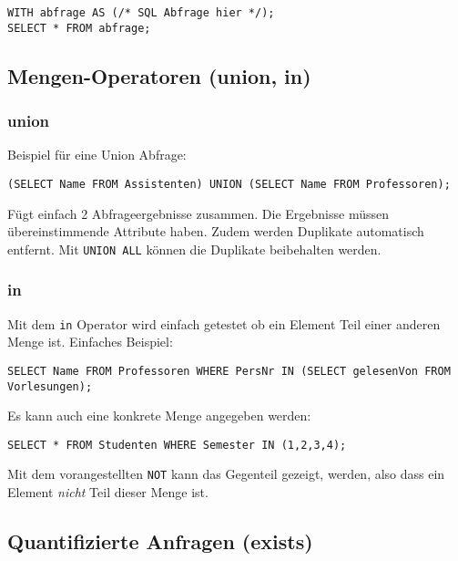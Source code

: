 \begin{lstlisting}[caption={with Operator},label=lst:with]
WITH abfrage AS (/* SQL Abfrage hier */);
SELECT * FROM abfrage;
\end{lstlisting}

\subsection{Mengen-Operatoren (union, in)}
\label{sec:mengen_operatoren}

\subsubsection{union}
Beispiel für eine Union Abfrage:

\begin{lstlisting}[caption={Union Abfrage Beispiel},label=lst:union_bsp]
(SELECT Name FROM Assistenten) UNION (SELECT Name FROM Professoren);
\end{lstlisting}

Fügt einfach 2 Abfrageergebnisse zusammen. Die Ergebnisse müssen übereinstimmende Attribute haben. Zudem werden Duplikate automatisch entfernt. Mit \texttt{UNION ALL} können die Duplikate beibehalten werden.

\subsubsection{in}
\label{sec:in_operator}

Mit dem \texttt{in} Operator wird einfach getestet ob ein Element Teil einer anderen Menge ist. Einfaches Beispiel:
\begin{lstlisting}[caption={Beispiel in Operator},label=lst:in_bsp]
SELECT Name FROM Professoren WHERE PersNr IN (SELECT gelesenVon FROM Vorlesungen);
\end{lstlisting}

Es kann auch eine konkrete Menge angegeben werden:

\begin{lstlisting}[caption={Diskrete Menge IN}]
SELECT * FROM Studenten WHERE Semester IN (1,2,3,4);
\end{lstlisting}

Mit dem vorangestellten \texttt{NOT} kann das Gegenteil gezeigt, werden, also dass ein Element \textit{nicht} Teil dieser Menge ist.

\subsection{Quantifizierte Anfragen (exists)}

